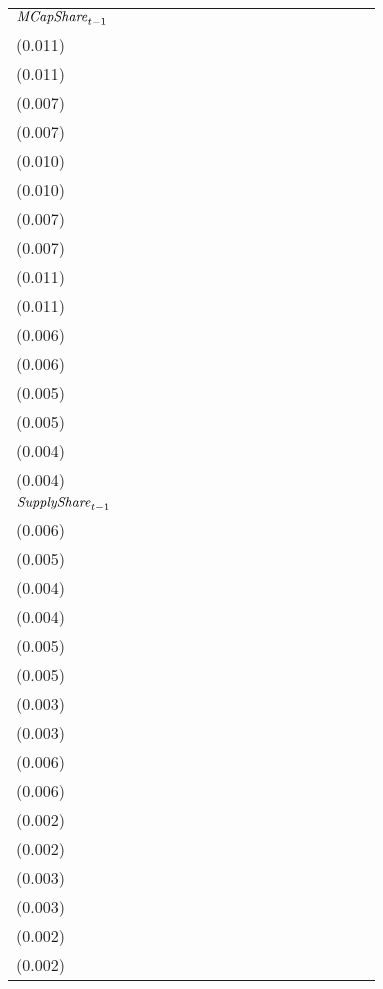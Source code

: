 \begin{tabular}{lllllllllllllllll}
${{\it MCapShare}}_{t-1}$    &  \makecell{$-0.066^{**}$ \\(0.011)} &  \makecell{$-0.068^{**}$ \\(0.011)} &  \makecell{$-0.031^{**}$ \\(0.007)} &  \makecell{$-0.032^{**}$ \\(0.007)} &   \makecell{$1.137^{**}$ \\(0.010)} &   \makecell{$1.133^{**}$ \\(0.010)} &   \makecell{$0.172^{**}$ \\(0.007)} &   \makecell{$0.171^{**}$ \\(0.007)} &   \makecell{$1.463^{**}$ \\(0.011)} &   \makecell{$1.459^{**}$ \\(0.011)} &  \makecell{$0.085^{**}$ \\(0.006)} &  \makecell{$0.084^{**}$ \\(0.006)} &   \makecell{$0.238^{**}$ \\(0.005)} &  \makecell{$0.239^{**}$ \\(0.005)} &  \makecell{$0.055^{**}$ \\(0.004)} &  \makecell{$0.055^{**}$ \\(0.004)} \\
${{\it SupplyShare}}_{t-1}$  &   \makecell{$0.092^{**}$ \\(0.006)} &   \makecell{$0.093^{**}$ \\(0.005)} &   \makecell{$0.036^{**}$ \\(0.004)} &   \makecell{$0.036^{**}$ \\(0.004)} &  \makecell{$-0.082^{**}$ \\(0.005)} &  \makecell{$-0.081^{**}$ \\(0.005)} &  \makecell{$-0.014^{**}$ \\(0.003)} &  \makecell{$-0.013^{**}$ \\(0.003)} &  \makecell{$-0.062^{**}$ \\(0.006)} &  \makecell{$-0.062^{**}$ \\(0.006)} &   \makecell{$-0.004^{}$ \\(0.002)} &   \makecell{$-0.004^{}$ \\(0.002)} &   \makecell{$0.046^{**}$ \\(0.003)} &  \makecell{$0.046^{**}$ \\(0.003)} &  \makecell{$0.017^{**}$ \\(0.002)} &  \makecell{$0.017^{**}$ \\(0.002)} \\

\end{tabular}
